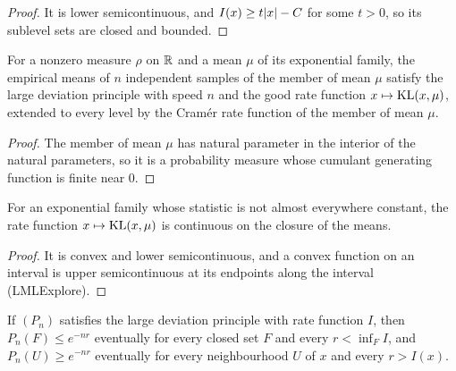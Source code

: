 \begin{proof}
  \leanok
  It is lower semicontinuous, and $I(x) \ge t \lvert x \rvert - C$ for some $t > 0$, so its sublevel sets
  are closed and bounded.
\end{proof}

\begin{lemma}
  \label{lem:cramer_expFamily}
  \leanok
  For a nonzero measure $\rho$ on $\mathbb{R}$ and a mean $\mu$ of its exponential family, the empirical
  means of $n$ independent samples of the member of mean $\mu$ satisfy the large deviation
  principle with speed $n$ and the good rate function $x \mapsto \mathrm{KL}(x, \mu)$, extended to every
  level by the Cramér rate function of the member of mean $\mu$.
\end{lemma}

\begin{proof}
  \leanok
  The member of mean $\mu$ has natural parameter in the interior of the natural parameters, so it
  is a probability measure whose cumulant generating function is finite near $0$.
\end{proof}

\begin{lemma}
  \label{lem:rate_continuousOn}
  \leanok
  For an exponential family whose statistic is not almost everywhere constant, the rate function
  $x \mapsto \mathrm{KL}(x, \mu)$ is continuous on the closure of the means.
\end{lemma}

\begin{proof}
  \leanok
  It is convex and lower semicontinuous, and a convex function on an interval is upper
  semicontinuous at its endpoints along the interval (LMLExplore).
\end{proof}

\begin{lemma}
  \label{lem:ldp_exp_bounds}
  \leanok
  If $(P_n)$ satisfies the large deviation principle with rate function $I$, then
  $P_n(F) \le e^{-n r}$ eventually for every closed set $F$ and every $r < \inf_F I$, and
  $P_n(U) \ge e^{-n r}$ eventually for every neighbourhood $U$ of $x$ and every $r > I(x)$.
\end{lemma}

